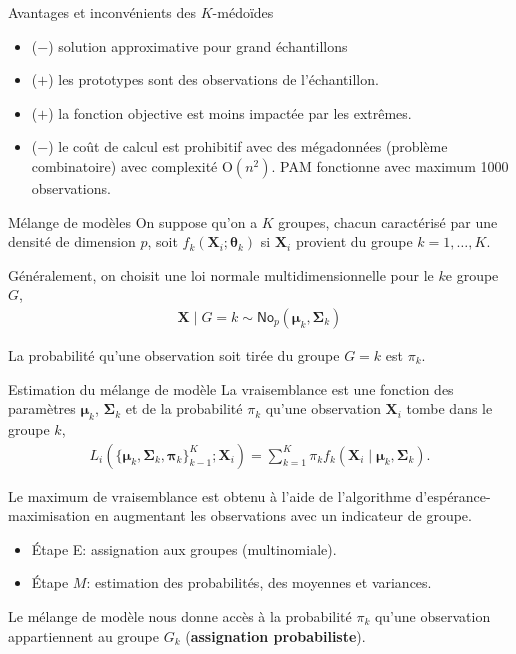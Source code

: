\documentclass[
  ignorenonframetext,
]{beamer}
\providecommand{\tightlist}{%
  \setlength{\itemsep}{0pt}\setlength{\parskip}{0pt}}\usepackage{longtable,booktabs,array}
\begin{document}
\begin{frame}{Avantages et inconvénients des \(K\)-médoïdes}
\protect\hypertarget{avantages-et-inconvuxe9nients-des-k-muxe9douxefdes}{}
\begin{itemize}
\tightlist
\item
  (\(-\)) solution approximative pour grand échantillons
\item
  (\(+\)) les prototypes sont des observations de l'échantillon.
\item
  (\(+\)) la fonction objective est moins impactée par les extrêmes.
\item
  (\(-\)) le coût de calcul est prohibitif avec des mégadonnées
  (problème combinatoire) avec complexité \(\mathrm{O}(n^2)\). PAM
  fonctionne avec maximum 1000 observations.
\end{itemize}
\end{frame}

\begin{frame}{Mélange de modèles}
\protect\hypertarget{muxe9lange-de-moduxe8les}{}
On suppose qu'on a \(K\) groupes, chacun caractérisé par une densité de
dimension \(p\), soit \(f_k(\boldsymbol{X}_i;\boldsymbol{\theta}_k)\) si
\(\boldsymbol{X}_i\) provient du groupe \(k=1, \ldots, K\).

Généralement, on choisit une loi normale multidimensionnelle pour le
\(k\)e groupe \(G\), \begin{align*}
\boldsymbol{X} \mid G=k \sim \mathsf{No}_p(\boldsymbol{\mu}_k, \boldsymbol{\Sigma}_k)
\end{align*}

La probabilité qu'une observation soit tirée du groupe \(G=k\) est
\(\pi_k\).
\end{frame}

\begin{frame}{Estimation du mélange de modèle}
\protect\hypertarget{estimation-du-muxe9lange-de-moduxe8le}{}
La vraisemblance est une fonction des paramètres \(\boldsymbol{\mu}_k\),
\(\boldsymbol{\Sigma}_k\) et de la probabilité \(\pi_k\) qu'une
observation \(\mathbf{X}_i\) tombe dans le groupe \(k\), \begin{align*}
 L_i(\{\boldsymbol{\mu}_k, \boldsymbol{\Sigma}_k, \boldsymbol{\pi}_k\}_{k-1}^K; \mathbf{X}_i)= \sum_{k=1}^K\pi_k
f_{k}(\boldsymbol{X}_i \mid \boldsymbol{\mu}_k, \boldsymbol{\Sigma}_k).
\end{align*}

Le maximum de vraisemblance est obtenu à l'aide de l'algorithme
d'espérance-maximisation en augmentant les observations avec un
indicateur de groupe.

\begin{itemize}
\tightlist
\item
  Étape E: assignation aux groupes (multinomiale).
\item
  Étape \(M\): estimation des probabilités, des moyennes et variances.
\end{itemize}

Le mélange de modèle nous donne accès à la probabilité \(\pi_k\) qu'une
observation appartiennent au groupe \(G_k\) (\textbf{assignation
probabiliste}).
\end{frame}
\end{document}
